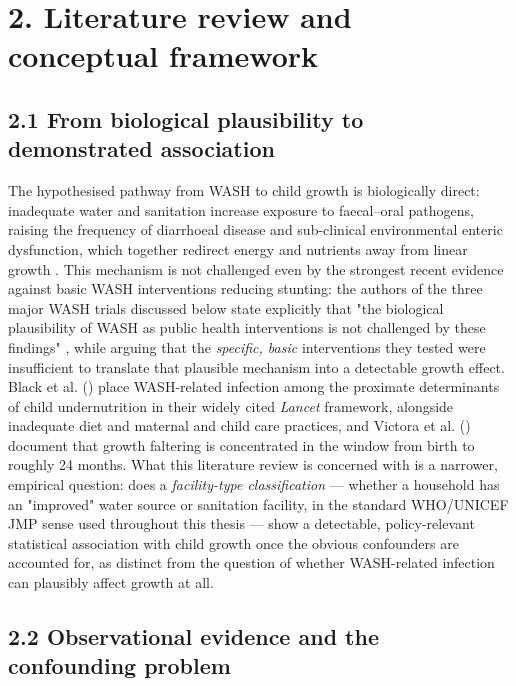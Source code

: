 \section*{2. Literature review and conceptual framework}

\subsection*{2.1 From biological plausibility to demonstrated association}

The hypothesised pathway from WASH to child growth is biologically direct: inadequate water and sanitation increase exposure to faecal--oral pathogens, raising the frequency of diarrhoeal disease and sub-clinical environmental enteric dysfunction, which together redirect energy and nutrients away from linear growth \parencite{CummingCairncross2016}. This mechanism is not challenged even by the strongest recent evidence against basic WASH interventions reducing stunting: the authors of the three major WASH trials discussed below state explicitly that "the biological plausibility of WASH as public health interventions is not challenged by these findings" \parencite[consensus message 2]{Cumming2019}, while arguing that the \textit{specific, basic} interventions they tested were insufficient to translate that plausible mechanism into a detectable growth effect. Black et al. (\citeyear{Black2013}) place WASH-related infection among the proximate determinants of child undernutrition in their widely cited \textit{Lancet} framework, alongside inadequate diet and maternal and child care practices, and Victora et al. (\citeyear{Victora2010}) document that growth faltering is concentrated in the window from birth to roughly 24 months. What this literature review is concerned with is a narrower, empirical question: does a \textit{facility-type classification} --- whether a household has an "improved" water source or sanitation facility, in the standard WHO/UNICEF JMP sense used throughout this thesis --- show a detectable, policy-relevant statistical association with child growth once the obvious confounders are accounted for, as distinct from the question of whether WASH-related infection can plausibly affect growth at all.

\subsection*{2.2 Observational evidence and the confounding problem}

